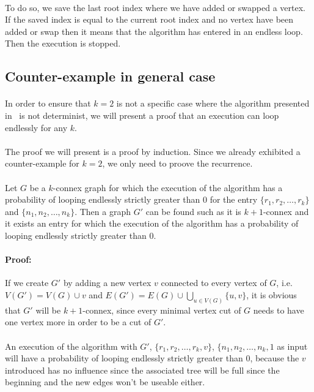 \paragraph{}
To do so, we save the last root index where we have added or swapped a vertex. If
the saved index is equal to the current root index and no vertex have been
added or swap then it means that the algorithm has entered in an endless loop. Then
the execution is stopped.

\subsection{Counter-example in general case}
\paragraph{}
In order to ensure that $k=2$ is not a specific case where the algorithm
presented in~\cite{JS94} is not determinist, we will present a proof that an
execution can loop endlessly for any $k$.

\paragraph{}
The proof we will present is a proof by induction. Since we already exhibited
a counter-example for $k=2$, we only need to proove the recurrence.

\paragraph{}
Let $G$ be a $k$-connex graph for which the execution of the algorithm has a
probability of looping endlessly strictly greater than $0$ for the entry
$\{r_1,r_2, \dots, r_k\}$ and $\{n_1,n_2, \dots, n_k\}$. Then a graph $G'$ can
be found such as it is $k+1$-connex and it exists an entry for which the
execution of the algorithm has a probability of looping endlessly strictly
greater than $0$.

\paragraph{Proof:}
If we create $G'$ by adding a new vertex $v$ connected to every vertex of $G$,
i.e. $V(G') = V(G) \cup v$ and
$E(G') = E(G) \cup \bigcup \limits_{u \in V(G)} \{u,v\}$, it is obvious that
$G'$ will be $k+1$-connex, since every minimal vertex cut of $G$ needs to have
 one vertex more in order to be a cut of $G'$.

\paragraph{}
An execution of the algorithm with $G'$, $\{r_1,r_2, \dots, r_k, v\}$,
$\{n_1,n_2, \dots, n_k, 1$ as input will have a probability of looping
endlessly strictly greater than $0$, because the $v$ introduced has no influence
since the associated tree will be full since the beginning and the new edges
won't be useable either.
